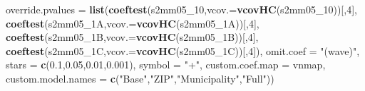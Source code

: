 \documentclass[
]{article}
\newenvironment{Shaded}{\begin{snugshade}}{\end{snugshade}}
\newcommand{\DataTypeTok}[1]{\textcolor[rgb]{0.13,0.29,0.53}{#1}}
\newcommand{\DecValTok}[1]{\textcolor[rgb]{0.00,0.00,0.81}{#1}}
\newcommand{\FloatTok}[1]{\textcolor[rgb]{0.00,0.00,0.81}{#1}}
\newcommand{\KeywordTok}[1]{\textcolor[rgb]{0.13,0.29,0.53}{\textbf{#1}}}
\newcommand{\NormalTok}[1]{#1}
\newcommand{\StringTok}[1]{\textcolor[rgb]{0.31,0.60,0.02}{#1}}
\begin{document}
\begin{Shaded}
\begin{Highlighting}[]
          \DataTypeTok{override.pvalues =} \KeywordTok{list}\NormalTok{(}\KeywordTok{coeftest}\NormalTok{(s2mm05_}\DecValTok{10}\NormalTok{,}\DataTypeTok{vcov.=}\KeywordTok{vcovHC}\NormalTok{(s2mm05_}\DecValTok{10}\NormalTok{))[,}\DecValTok{4}\NormalTok{],}
                                  \KeywordTok{coeftest}\NormalTok{(s2mm05_1A,}\DataTypeTok{vcov.=}\KeywordTok{vcovHC}\NormalTok{(s2mm05_1A))[,}\DecValTok{4}\NormalTok{],}
                                  \KeywordTok{coeftest}\NormalTok{(s2mm05_1B,}\DataTypeTok{vcov.=}\KeywordTok{vcovHC}\NormalTok{(s2mm05_1B))[,}\DecValTok{4}\NormalTok{],}
                                  \KeywordTok{coeftest}\NormalTok{(s2mm05_1C,}\DataTypeTok{vcov.=}\KeywordTok{vcovHC}\NormalTok{(s2mm05_1C))[,}\DecValTok{4}\NormalTok{]),}
          \DataTypeTok{omit.coef =} \StringTok{"(wave)"}\NormalTok{, }\DataTypeTok{stars =} \KeywordTok{c}\NormalTok{(}\FloatTok{0.1}\NormalTok{,}\FloatTok{0.05}\NormalTok{,}\FloatTok{0.01}\NormalTok{,}\FloatTok{0.001}\NormalTok{), }\DataTypeTok{symbol =} \StringTok{"+"}\NormalTok{,}
          \DataTypeTok{custom.coef.map =}\NormalTok{ vnmap, }
          \DataTypeTok{custom.model.names =} \KeywordTok{c}\NormalTok{(}\StringTok{"Base"}\NormalTok{,}\StringTok{"ZIP"}\NormalTok{,}\StringTok{"Municipality"}\NormalTok{,}\StringTok{"Full"}\NormalTok{))}
\end{Highlighting}
\end{Shaded}
\end{document}
